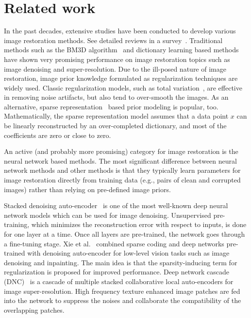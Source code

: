 




\section{Related work}
\label{sec:related}

In the past decades, extensive studies have been conducted to develop various
 image restoration methods. See detailed reviews in a survey~\cite{DBLP:journals/spm/Milanfar13}.
Traditional methods such as the BM3D algorithm~\cite{DBLP:journals/tip/DabovFKE07}
and dictionary learning based methods~\cite{DBLP:journals/tip/WangYWCYH15,
DBLP:conf/iccv/GuZXMFZ15,DBLP:journals/tip/ChatterjeeM09} have shown very promising
performance on image restoration topics such as image denoising and super-resolution.
Due to the ill-posed nature of image restoration, image prior knowledge formulated
as regularization techniques are widely used. Classic regularization models, such as
total variation~\cite{Rudin:1992:NTV:142273.142312,Chan05TV,Oli09TV}, are effective
in removing noise artifacts, but also tend to over-smooth the images. As an alternative,
sparse representation~\cite{DBLP:journals/tip/EladA06,DBLP:journals/tip/DongZSL13,
DBLP:journals/tip/DongZSW11,DBLP:journals/pami/KimK10,DBLP:journals/tip/YangWHM10} based
prior modeling is   popular, too. Mathematically, the sparse representation model
assumes that a data point $x$ can be linearly reconstructed by an over-completed dictionary,
and most of the coefficients are zero or close to zero.

An active (and probably more promising) category for image restoration is the neural
network based methods. The most significant difference between neural network methods
and other methods is that they typically learn parameters for image restoration directly
from training data (e.g., pairs of clean and corrupted images) rather than relying on
pre-defined image priors.


Stacked denoising auto-encoder~\cite{DBLP:conf/icml/VincentLBM08} is one of the most well-known
deep neural network models which can be used for image denoising. Unsupervised pre-training,
which minimizes the reconstruction error with respect to inputs, is done for one layer at a time.
Once all layers are pre-trained, the network goes through a fine-tuning stage. Xie et al.~\cite{DBLP:conf/nips/XieXC12}
combined sparse coding and deep networks pre-trained with denoising auto-encoder for
low-level vision tasks such as image denoising and inpainting. The main idea is that the
sparsity-inducing term for regularization is proposed for improved performance. Deep network
cascade (DNC)~\cite{DBLP:conf/eccv/CuiCSZC14} is a cascade of multiple stacked collaborative
local auto-encoders for image super-resolution.  High frequency texture enhanced image patches are fed
into the network to suppress the noises and collaborate the compatibility of the overlapping patches.


